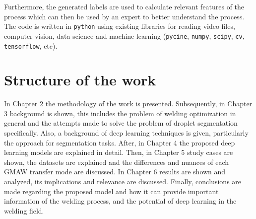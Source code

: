 \begin{intro}
Furthermore, the generated labels are used to calculate relevant features of the process which can then be used by an expert to better understand the process. The code is written in \texttt{python} using existing libraries for reading video files, computer vision, data science and machine learning (\texttt{pycine}, \texttt{numpy}, \texttt{scipy}, \texttt{cv}, \texttt{tensorflow}, etc).

\section{Structure of the work}

In Chapter 2 the methodology of the work is presented. Subsequently, in Chapter 3 background is shown, this includes the problem of welding optimization in general and the attempts made to solve the problem of droplet segmentation specifically. Also, a background of deep learning techniques is given, particularly the approach for segmentation tasks. After, in Chapter 4 the proposed deep learning models are explained in detail. Then, in Chapter 5 study cases are shown, the datasets are explained and the differences and nuances of each GMAW transfer mode are discussed. In Chapter 6 results are shown and analyzed, its implications and relevance are discussed. Finally, conclusions are made regarding the proposed model and how it can provide important information of the welding process, and the potential of deep learning in the welding field.


\end{intro}